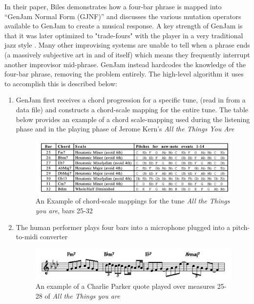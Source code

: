 \documentclass[../main.tex]{subfiles}
\begin{document}
In their paper, Biles demonstrates how a four-bar phrase is mapped into ``GenJam Normal Form (GJNF)'' and discusses the various mutation operators available to GenJam to create a musical response. A key strength of GenJam is that it was later optimized to "trade-fours" with the player in a very traditional jazz style \cite{Biles:2}. Many other improvising systems are unable to tell when a phrase ends (a massively subjective art in and of itself) which means they frequently interrupt another improvisor mid-phrase. GenJam instead hardcodes the knowledge of the four-bar phrase, removing the problem entirely. The high-level algorithm it uses to accomplish this is described below:

\begin{enumerate}
    \item GenJam first receives a chord progression for a specific tune, (read in from a data file) and constructs a chord-scale mapping for the entire tune. The table below provides an example of a chord scale-mapping used during the listening phase and in the playing phase of Jerome Kern's \textit{All the Things You Are}

    \begin{figure}[htbp]
        \includegraphics[width=1\textwidth,]{imgs/genJam_chordscalemapping.png}
        \caption{An Example of chord-scale mappings for the tune \textit{All the Things you are}, bars 25-32}
        \label{fig:genJam_chordscalemapping}
    \end{figure}
    
    \item The human performer plays four bars into a microphone plugged into a pitch-to-midi converter

    \begin{figure}[htbp]
        \includegraphics[width=1\textwidth,]{imgs/genJam_originaltune.png}
        \caption{An example of a Charlie Parker quote played over measures 25-28 of \textit{All the Things you are}}
        \label{fig:genJam_originaltune}
    \end{figure}


\end{enumerate}
\end{document}
